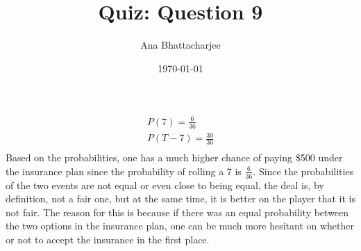 \documentclass{article}
\begin{document}
\title{Quiz: Question 9}
\author{Ana Bhattacharjee}
\date{\today}
\maketitle

\begin{center}
  \begin{align}
    P(7) = \frac{6}{36} \\
    P(T - 7) = \frac{30}{36} \\
  \end{align}
  Based on the probabilities, one has a much higher chance of paying \$500 under the insurance plan since the probability of rolling a 7 is $\frac{6}{36}$. Since the probabilities of the two events are not equal or even close to being equal, the deal is, by definition, not a fair one, but at the same time, it is better on the player that it is not fair. The reason for this is because if there was an equal probability between the two options in the insurance plan, one can be much more hesitant on whether or not to accept the insurance in the first place. 
\end{center}
\end{document}
